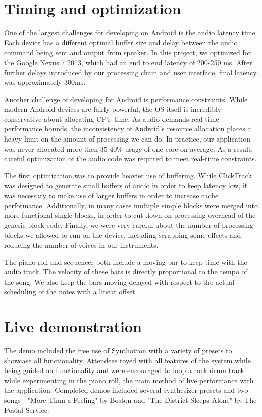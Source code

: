 \documentclass[letterpaper,12pt]{article}
\begin{document}
\section{Timing and optimization}

One of the largest challenges for developing on Android is the audio latency time. Each device has a different optimal buffer size and delay between the audio command being sent and output from speaker. In this project, we optimized for the Google Nexus 7 2013, which had an end to end latency of 200-250 ms. After further delays introduced by our processing chain and user interface, final latency was approximately 300ms.

Another challenge of developing for Android is performance constraints. While modern Android devices are fairly powerful, the OS itself is incredibly conservative about allocating CPU time. As audio demands real-time performance bounds, the inconsistency of Android's resource allocation places a heavy limit on the amount of processing we can do. In practice, our application was never allocated more then 35-40\% usage of one core on average. As a result, careful optimization of the audio code was required to meet real-time constraints.

The first optimization was to provide heavier use of buffering. While ClickTrack was designed to generate small buffers of audio in order to keep latency low, it was necessary to make use of larger buffers in order to increase cache performance. Additionally, in many cases multiple simple blocks were merged into more functional single blocks, in order to cut down on processing overhead of the generic block code. Finally, we were very careful about the number of processing blocks we allowed to run on the device, including scrapping some effects and reducing the number of voices in our instruments.

The piano roll and sequencer both include a moving bar to keep time with the audio track. The velocity of these bars is directly proportional to the tempo of the song. We also keep the bars moving delayed with respect to the actual scheduling of the notes with a linear offset.



\section{Live demonstration}
The demo included the free use of Synthotron with a variety of presets to showcase all functionality. Attendees toyed with all features of the system while being guided on functionality and were encouraged to loop a rock drum track while experimenting in the piano roll, the main method of live performance with the application. Completed demos included several synthesizer presets and two songs - "More Than a Feeling" by Boston and "The District Sleeps Alone" by The Postal Service.
\end{document}
